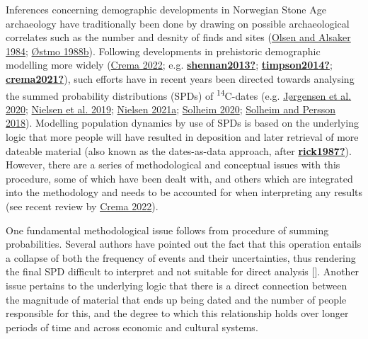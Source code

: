 \documentclass[
  12pt,
  a4paper,
  oneside]{book}
\begin{document}
Inferences concerning demographic developments in Norwegian Stone Age archaeology have traditionally been done by drawing on possible archaeological correlates such as the number and desnity of finds and sites (\protect\hyperlink{ref-olsen1984}{Olsen and Alsaker 1984}; \protect\hyperlink{ref-uxf8stmo1988}{Østmo 1988b}). Following developments in prehistoric demographic modelling more widely (\protect\hyperlink{ref-crema2022}{Crema 2022}; e.g. \protect\hyperlink{ref-shennan2013}{\textbf{shennan2013?}}; \protect\hyperlink{ref-timpson2014}{\textbf{timpson2014?}}; \protect\hyperlink{ref-crema2021}{\textbf{crema2021?}}), such efforts have in recent years been directed towards analysing the summed probability distributions (SPDs) of \textsuperscript{14}C-dates (e.g. \protect\hyperlink{ref-jorgensen2020}{Jørgensen et al. 2020}; \protect\hyperlink{ref-nielsen2019}{Nielsen et al. 2019}; \protect\hyperlink{ref-nielsen2021}{Nielsen 2021a}; \protect\hyperlink{ref-solheim2020}{Solheim 2020}; \protect\hyperlink{ref-solheim2018}{Solheim and Persson 2018}). Modelling population dynamics by use of SPDs is based on the underlying logic that more people will have resulted in deposition and later retrieval of more dateable material (also known as the dates-as-data approach, after \protect\hyperlink{ref-rick1987}{\textbf{rick1987?}}). However, there are a series of methodological and conceptual issues with this procedure, some of which have been dealt with, and others which are integrated into the methodology and needs to be accounted for when interpreting any results (see recent review by \protect\hyperlink{ref-crema2022}{Crema 2022}).

One fundamental methodological issue follows from procedure of summing probabilities. Several authors have pointed out the fact that this operation entails a collapse of both the frequency of events and their uncertainties, thus rendering the final SPD difficult to interpret and not suitable for direct analysis {[}{]}. Another issue pertains to the underlying logic that there is a direct connection between the magnitude of material that ends up being dated and the number of people responsible for this, and the degree to which this relationship holds over longer periods of time and across economic and cultural systems.
\end{document}

